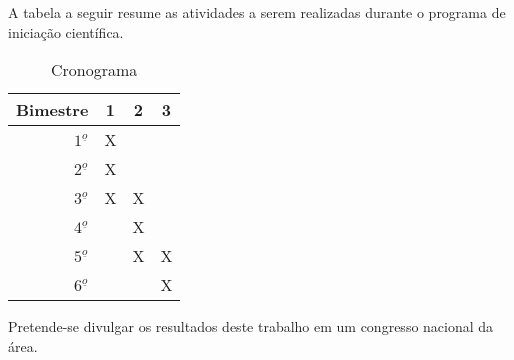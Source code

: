 \documentclass[12pt]{article}
\begin{document}
A tabela a seguir resume as atividades a serem realizadas durante
o programa de iniciação científica.

\begin{table}
\caption{Cronograma}
\begin{tabular}{|r|c|c|c|} \hline
Bimestre & 1 & 2 & 3\\
\hline
$1^{\underline{o}}$ & X &   &   \\
\hline
$2^{\underline{o}}$ & X &   &   \\
\hline
$3^{\underline{o}}$ & X & X &   \\
\hline
$4^{\underline{o}}$ &   & X &   \\
\hline
$5^{\underline{o}}$ &   & X & X \\
\hline
$6^{\underline{o}}$ &   &   & X \\
\hline
\end{tabular}
\end{table}

Pretende-se divulgar os resultados deste trabalho em um congresso nacional
da área.



\end{document}
